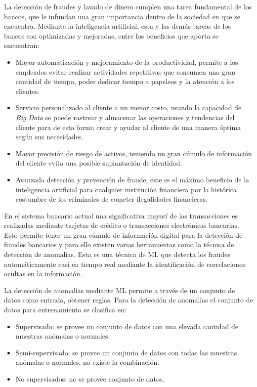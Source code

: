   La detecci\'{o}n de fraudes y lavado de dinero cumplen una tarea fundamental de los bancos, que le infundan una gran importancia dentro de la sociedad en que se encuentra. Mediante la inteligencia artificial, esta y las dem\'{a}s tareas de los bancos son optimizadas y mejoradas, entre los beneficios que aporta se encuentran\cite{3}:
  
  \begin{itemize}
  	\item Mayor automatizaci\'{o}n y mejoramiento de la productividad, permite a los empleados evitar realizar actividades repetitivas que consumen una gran cantidad de tiempo, poder dedicar tiempo a papeleos y la atenci\'{o}n a los clientes.
  	\item Servicio personalizado al cliente a un menor costo, usando la capacidad de \textit{Big Data} se puede rastrear y almacenar las operaciones y tendencias del cliente para de esta forma crear y ayudar al cliente de una manera \'{o}ptima seg\'{u}n sus necesidades.
  	\item Mayor precisi\'{o}n de riesgo de activos, teniendo un gran c\'{u}mulo de informaci\'{o}n del cliente evita una posible suplantaci\'{o}n de identidad.
  	\item Avanzada detecci\'{o}n y prevenci\'{o}n de fraude, este es el m\'{a}ximo beneficio de la inteligencia artificial para cualquier instituci\'{o}n financiera por la hist\'{o}rica costumbre de los criminales de cometer ilegalidades financieras.
  \end{itemize}

  En el sistema bancario actual una significativa mayor\'{i} de las transacciones es realizadas mediante tarjetas de cr\'{e}dito o transacciones electr\'{o}nicas bancarias. Esto permite tener un gran c\'{u}mulo de informaci\'{o}n digital para la detecci\'{o}n de fraudes bancarios y para ello existen varias herramientas como la t\'{e}cnica de detecci\'{o}n de anomal\'{i}as. Esta es una t\'{e}cnica de ML que detecta los fraudes autom\'{a}ticamente casi en tiempo real mediante la identificaci\'{o}n de correlaciones ocultas en la informaci\'{o}n.
  
  La detecci\'{o}n de anomal\'{i}as mediante ML permite a trav\'{e}s de un conjunto de datos como entrada, obtener reglas. Para la detecci\'{o}n de anomal\'{i}as el conjunto de datos para entrenamiento se clasifica en:
  
  \begin{itemize}
  	\item Supervisado: se provee un conjunto de datos con una elevada cantidad de muestras an\'{o}malas o normales.
  	\item Semi-supervisado: se provee un conjunto de datos con todas las muestras an\'{o}malas o normales, no existe la combinaci\'{o}n.
  	\item No supervisados: no se provee conjunto de datos.
  \end{itemize}

